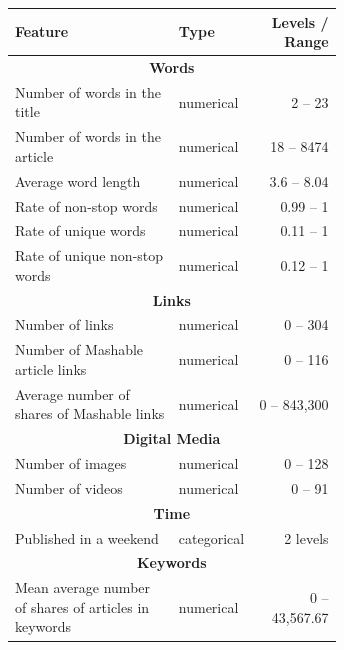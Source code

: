 \documentclass{article}
\begin{document}



\appendix

\begin{table}
    \centering
    \begin{tabular}{|p{0.5\linewidth}|p{0.15\linewidth}|r|}
        \hline
        \textbf{Feature} & \textbf{Type} & \textbf{Levels / Range}
        \\
        \hline
        \multicolumn{3}{|c|}{\textbf{Words}}
        \\
        \hline
        Number of words in the title & numerical & 2 -- 23
        \\
        \hline
        Number of words in the article & numerical & 18 -- 8474
        \\
        \hline
        Average word length & numerical & 3.6 -- 8.04
        \\
        \hline
        Rate of non-stop words & numerical & 0.99 -- 1
        \\
        \hline
        Rate of unique words & numerical & 0.11 -- 1
        \\
        \hline
        Rate of unique non-stop words & numerical & 0.12 -- 1
        \\
        \hline
        \multicolumn{3}{|c|}{\textbf{Links}}
        \\
        \hline
        Number of links & numerical & 0 -- 304
        \\
        \hline
        Number of Mashable article links & numerical & 0 -- 116
        \\
        \hline
        Average number of shares of Mashable links & numerical & 0 -- 843,300
        \\
        \hline
        \multicolumn{3}{|c|}{\textbf{Digital Media}}
        \\
        \hline
        Number of images & numerical & 0 -- 128
        \\
        \hline
        Number of videos & numerical & 0 -- 91
        \\
        \hline
        \multicolumn{3}{|c|}{\textbf{Time}}
        \\
        \hline
        Published in a weekend & categorical & 2 levels
        \\
        \hline
        \multicolumn{3}{|c|}{\textbf{Keywords}}
        \\
        \hline
        Mean average number of shares of articles in keywords & numerical & 0 -- 43,567.67

\end{tabular}
\end{table}
\end{document}
